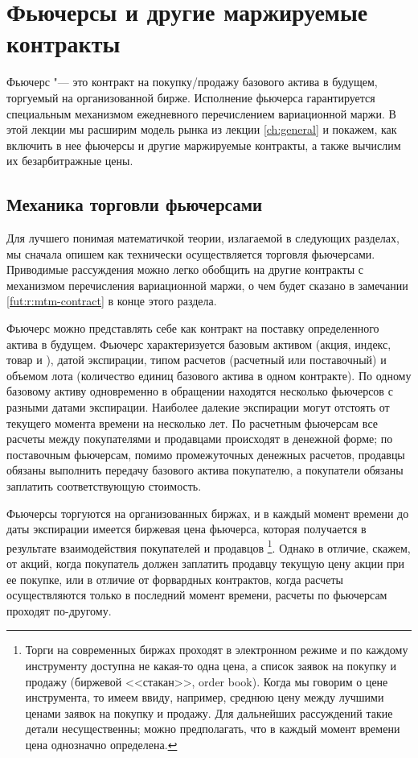 \chapter{Фьючерсы и другие маржируемые контракты}
\label{ch:futures-discrete}
\chaptertoc

Фьючерс "--- это контракт на покупку/продажу базового актива в будущем, торгуемый на организованной бирже.
Исполнение фьючерса гарантируется специальным механизмом ежедневного перечислением вариационной маржи.
В этой лекции мы расширим модель рынка из лекции \ref{ch:general} и покажем, как включить в нее фьючерсы и другие маржируемые контракты, а также вычислим их безарбитражные цены.


\section{Механика торговли фьючерсами}
Для лучшего понимая математичкой теории, излагаемой в следующих разделах, мы сначала опишем как технически осуществляется торговля фьючерсами.
Приводимые рассуждения можно легко обобщить на другие контракты с механизмом перечисления вариационной маржи, о чем будет сказано в замечании \ref{fut:r:mtm-contract} в конце этого раздела.

Фьючерс можно представлять себе как контракт на поставку определенного актива в будущем. 
Фьючерс характеризуется базовым активом (акция, индекс, товар и \tp), датой экспирации, типом расчетов (расчетный или поставочный) и объемом лота (количество единиц базового актива в одном контракте).
По одному базовому активу одновременно в обращении находятся несколько фьючерсов с разными датами экспирации.
Наиболее далекие экспирации могут отстоять от текущего момента времени на несколько лет.
По расчетным фьючерсам все расчеты между покупателями и продавцами происходят в денежной форме; по поставочным фьючерсам, помимо промежуточных денежных расчетов, продавцы обязаны выполнить передачу базового актива покупателю, а покупатели обязаны заплатить соответствующую стоимость.

Фьючерсы торгуются на организованных биржах, и в каждый момент времени до даты экспирации имеется биржевая цена фьючерса, которая получается в результате взаимодействия покупателей и продавцов%
\footnote{Торги на современных биржах проходят в электронном режиме и по каждому инструменту доступна не какая-то одна цена, а список заявок на покупку и продажу (биржевой <<стакан>>, order book). 
Когда мы говорим о цене инструмента, то имеем ввиду, например, среднюю цену между лучшими ценами заявок на покупку и продажу.
Для дальнейших рассуждений такие детали несущественны; можно предполагать, что в каждый момент времени  цена однозначно определена.}.
Однако в отличие, скажем, от акций, когда покупатель должен заплатить продавцу текущую цену акции при ее покупке, или в отличие от форвардных контрактов, когда расчеты осуществляются только в последний момент времени, расчеты по фьючерсам проходят по-другому.

